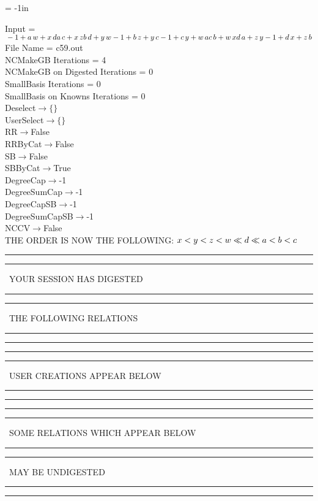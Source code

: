 \voffset = -1in
\evensidemargin 0.1in
\oddsidemargin 0.1in
\textheight 9in
\textwidth 6in

\normalsize
\baselineskip=12pt
\noindent
Input = 
$
\\-1 + a\,
 w + x\,
 d\\
a\,
 c + x\,
 z\\
b\,
 d + y\,
 w\\
-1 + b\,
 z + y\,
 c\\
-1 + c\,
 y + w\,
 a\\
c\,
 b + w\,
 x\\
d\,
 a + z\,
 y\\
-1 + d\,
 x + z\,
 b\\
$
File Name = c59.out\\
NCMakeGB Iterations = 4\\
NCMakeGB on Digested Iterations = 0\\
SmallBasis Iterations = 0\\
SmallBasis on Knowns Iterations = 0\\
Deselect$\rightarrow \{\}$\\
UserSelect$\rightarrow \{\}$\\
RR$\rightarrow $False\\
RRByCat$\rightarrow $False\\
SB$\rightarrow $False\\
SBByCat$\rightarrow $True\\
DegreeCap$\rightarrow $-1\\
DegreeSumCap$\rightarrow $-1\\
DegreeCapSB$\rightarrow $-1\\
DegreeSumCapSB$\rightarrow $-1\\
NCCV$\rightarrow $False\\
THE ORDER IS NOW THE FOLLOWING:\hfil\break
$
x<y<z<w\ll
d\ll
a<b<c\\
$
\rule[2pt]{6in}{4pt}\hfil\break
\rule[2pt]{1.879in}{4pt}
\ YOUR SESSION HAS DIGESTED\ 
\rule[2pt]{1.879in}{4pt}\hfil\break
\rule[2pt]{1.923in}{4pt}
\ THE FOLLOWING RELATIONS\ 
\rule[2pt]{1.923in}{4pt}\hfil\break
\rule[2pt]{6in}{4pt}\hfil\break
\rule[2pt]{6in}{1pt}\hfil\break
\rule[2.5pt]{1.701in}{1pt}
\ USER CREATIONS APPEAR BELOW\ 
\rule[2.5pt]{1.701in}{1pt}\hfil\break
\rule[2pt]{6in}{1pt}\hfil\break
\rule[2pt]{6in}{4pt}\hfil\break
\rule[2pt]{1.45in}{4pt}
\ SOME RELATIONS WHICH APPEAR BELOW\ 
\rule[2pt]{1.45in}{4pt}\hfil\break
\rule[2pt]{2.18in}{4pt}
\ MAY BE UNDIGESTED\ 
\rule[2pt]{2.18in}{4pt}\hfil\break
\rule[2pt]{6in}{4pt}\hfil\break
